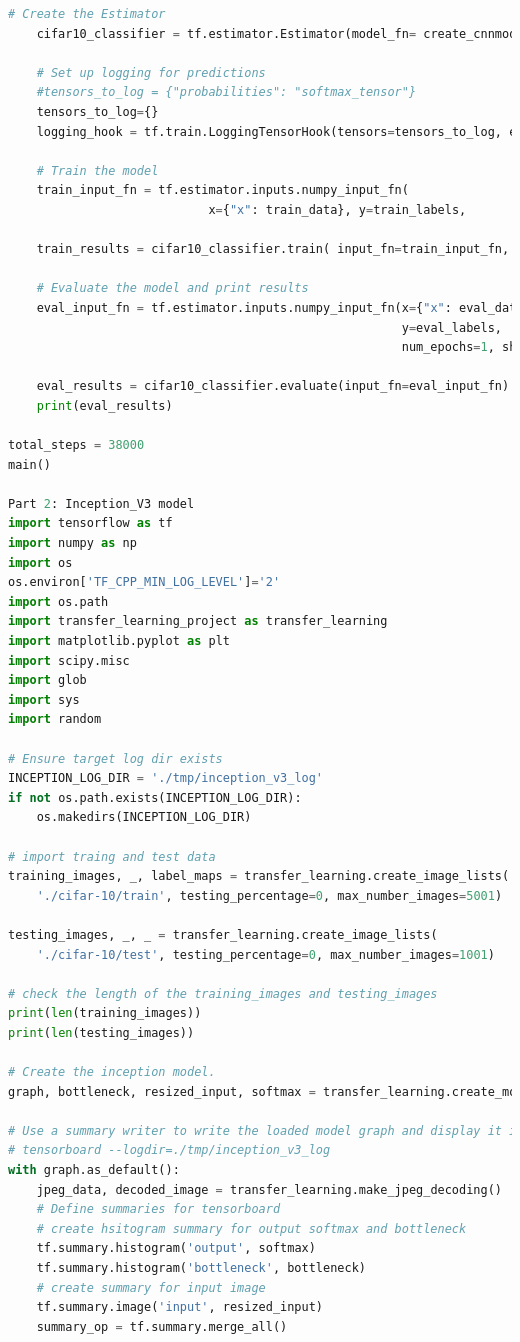 \documentclass[hyperref]{article}
\theoremstyle{nonumberplain}
\begin{document}
\begin{appendices}
\begin{lstlisting}[language=Python]
    # Create the Estimator
    cifar10_classifier = tf.estimator.Estimator(model_fn= create_cnnmodel, model_dir="./outhook/convnet_model")

    # Set up logging for predictions
    #tensors_to_log = {"probabilities": "softmax_tensor"}
    tensors_to_log={}
    logging_hook = tf.train.LoggingTensorHook(tensors=tensors_to_log, every_n_iter=100)

    # Train the model
    train_input_fn = tf.estimator.inputs.numpy_input_fn(
                            x={"x": train_data}, y=train_labels,                                                        batch_size= 128, num_epochs=100, shuffle=True)

    train_results = cifar10_classifier.train( input_fn=train_input_fn, steps= total_steps, hooks=[logging_hook])

    # Evaluate the model and print results
    eval_input_fn = tf.estimator.inputs.numpy_input_fn(x={"x": eval_data},
                                                       y=eval_labels,
                                                       num_epochs=1, shuffle=False)

    eval_results = cifar10_classifier.evaluate(input_fn=eval_input_fn)
    print(eval_results)

total_steps = 38000
main()

Part 2: Inception_V3 model
import tensorflow as tf
import numpy as np
import os
os.environ['TF_CPP_MIN_LOG_LEVEL']='2'
import os.path
import transfer_learning_project as transfer_learning
import matplotlib.pyplot as plt
import scipy.misc
import glob
import sys
import random

# Ensure target log dir exists
INCEPTION_LOG_DIR = './tmp/inception_v3_log'
if not os.path.exists(INCEPTION_LOG_DIR):
    os.makedirs(INCEPTION_LOG_DIR)

# import traing and test data
training_images, _, label_maps = transfer_learning.create_image_lists(
    './cifar-10/train', testing_percentage=0, max_number_images=5001)

testing_images, _, _ = transfer_learning.create_image_lists(
    './cifar-10/test', testing_percentage=0, max_number_images=1001)

# check the length of the training_images and testing_images
print(len(training_images))
print(len(testing_images))

# Create the inception model.
graph, bottleneck, resized_input, softmax = transfer_learning.create_model()

# Use a summary writer to write the loaded model graph and display it in tensorboard.
# tensorboard --logdir=./tmp/inception_v3_log
with graph.as_default():
    jpeg_data, decoded_image = transfer_learning.make_jpeg_decoding()
    # Define summaries for tensorboard
    # create hsitogram summary for output softmax and bottleneck
    tf.summary.histogram('output', softmax)
    tf.summary.histogram('bottleneck', bottleneck)
    # create summary for input image
    tf.summary.image('input', resized_input)
    summary_op = tf.summary.merge_all()


\end{lstlisting}
\end{appendices}
\end{document}
